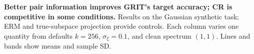 \textbf{Better pair information improves GRIT's target accuracy; CR is competitive in some conditions.} Results on the Gaussian synthetic task; ERM and true-subspace projection provide controls. Each column varies one quantity from defaults $k=256$, $\sigma_\xi=0.1$, and clean spectrum $(1,1)$. Lines and bands show means and sample SD.
